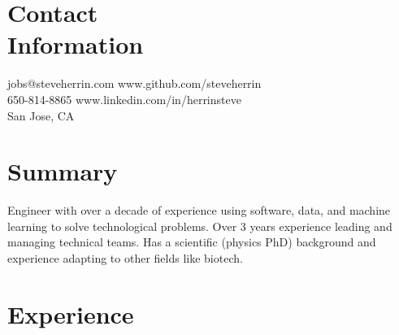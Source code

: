\documentclass[margin,line]{resume}
\begin{document}
\begin{resume}

    \section{\mysidestyle Contact\\Information}

    jobs@steveherrin.com		\hfill www.github.com/steveherrin		\vspace{0mm}\\\vspace{0mm}%
    650-814-8865				\hfill www.linkedin.com/in/herrinsteve		\vspace{0mm}\\\vspace{-4.5mm}%
    San Jose, CA    				\hfill		\vspace{0mm}\\%

    \section{\mysidestyle Summary}
    Engineer with over a decade of experience using software, data, and machine learning to solve technological problems. Over 3 years experience leading and managing technical teams. Has a scientific (physics PhD) background and experience adapting to other fields like biotech.
    \section{\mysidestyle Experience}


\end{resume}
\end{document}
